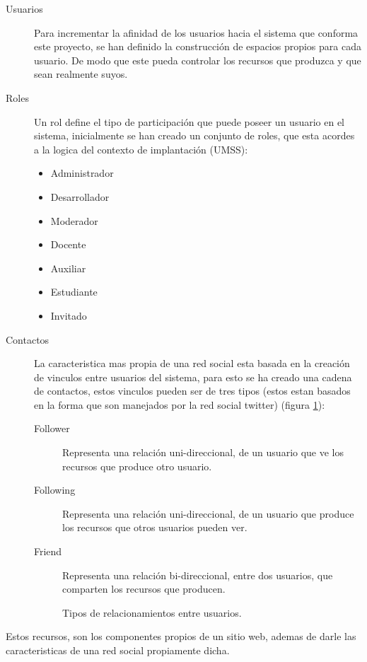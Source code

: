 \begin{description}
\item [Usuarios] Para incrementar la afinidad de los usuarios hacia el sistema
que conforma este proyecto, se han definido la construcción de espacios propios
para cada usuario. De modo que este pueda controlar los recursos que produzca y
que sean realmente suyos.
\item [Roles] Un rol define el tipo de participación que puede poseer un usuario
en el sistema, inicialmente se han creado un conjunto de roles, que esta acordes
a la logica del contexto de implantación (UMSS):
    \begin{itemize}
    \item Administrador
    \item Desarrollador
    \item Moderador
    \item Docente
    \item Auxiliar
    \item Estudiante
    \item Invitado
    \end{itemize}
\item [Contactos] La caracteristica mas propia de una red social esta basada en
la creación de vinculos entre usuarios del sistema, para esto se ha creado una
cadena de contactos, estos vinculos pueden ser de tres tipos (estos estan
basados en la forma que son manejados por la red social twitter) (figura
\ref{contactos}):
    \begin{description}
    \item [Follower] Representa una relación uni-direccional, de un usuario que
    ve los recursos que produce otro usuario.
    \item [Following] Representa una relación uni-direccional, de un usuario que
    produce los recursos que otros usuarios pueden ver.
    \item [Friend] Representa una relación bi-direccional, entre dos usuarios,
    que comparten los recursos que producen.
    \end{description}
    \begin{figure}
    \centering
    
    \caption{Tipos de relacionamientos entre usuarios.}
    \label{contactos}
    \end{figure}
\end{description}

Estos recursos, son los componentes propios de un sitio web, ademas de darle las
caracteristicas de una red social propiamente dicha.

